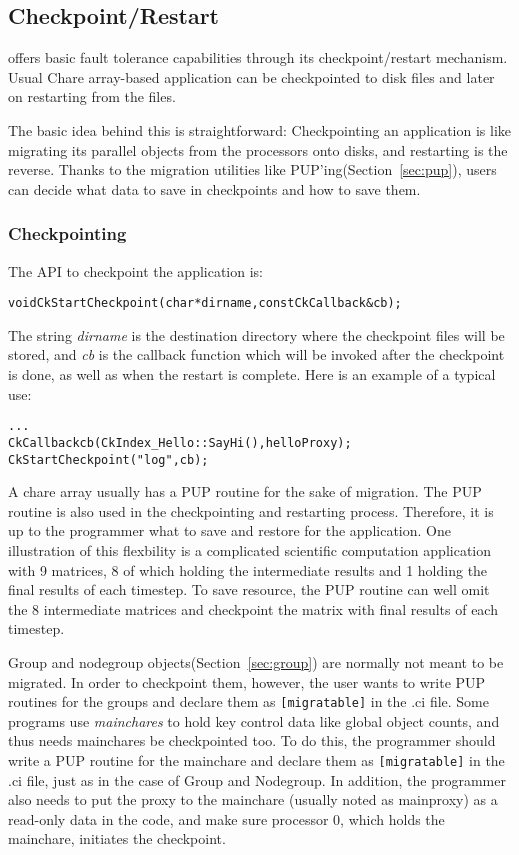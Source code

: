 \subsection{Checkpoint/Restart}
\label{sec:checkpoint}

\charmpp{} offers basic fault tolerance capabilities through its 
checkpoint/restart mechanism. Usual Chare array-based \charmpp{} application 
can be checkpointed to disk files and later on restarting from the files.

The basic idea behind this is straightforward: Checkpointing an 
application is like migrating its parallel objects from the processors
onto disks, and restarting is the reverse. Thanks to the migration 
utilities like PUP'ing(Section~\ref{sec:pup}), users can decide what 
data to save in checkpoints and how to save them.

\subsubsection{Checkpointing}
	The API to checkpoint the application is:

\begin{alltt} 
  void CkStartCheckpoint(char* dirname,const CkCallback& cb);
\end{alltt}

The string {\it dirname} is the destination directory where the checkpoint
files will be stored, and {\it cb} is the callback function which will be
invoked after the checkpoint is done, as well as when the restart is
complete. Here is an example of a typical use:

\begin{alltt} 
  . . .
  CkCallback cb(CkIndex_Hello::SayHi(),helloProxy);
  CkStartCheckpoint("log",cb);
\end{alltt}

A chare array usually has a PUP routine for the sake of migration. 
The PUP routine is also used in the checkpointing and restarting process.
Therefore, it is up to the programmer what to save and restore for
the application. One illustration of this flexbility is a complicated
scientific computation application with 9 matrices, 8 of which holding 
the intermediate results and 1 holding the final results of each timestep.
To save resource, the PUP routine can well omit the 8 intermediate matrices
and checkpoint the matrix with final results of each timestep. 

Group and nodegroup objects(Section~\ref{sec:group}) are normally not 
meant to be migrated. In order to checkpoint them, however, the user 
wants to write PUP routines for the groups and declare them as 
{\tt [migratable]} in the .ci file. Some programs use {\it mainchares}
to hold key control data like global object counts, and thus needs
mainchares be checkpointed too. To do this, the programmer should write
a PUP routine for the mainchare and declare them as {\tt [migratable]} 
in the .ci file, just as in the case of Group and Nodegroup. In addition,
the programmer also needs to put the proxy to the mainchare (usually 
noted as mainproxy) as a read-only data in the code, and make sure 
processor 0, which holds the mainchare, initiates the checkpoint.

